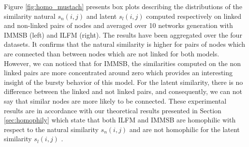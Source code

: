Figure \ref{fig:homo_mustach} presents box plots describing the distributions of the similarity natural $s_n(i,j)$ and latent $s_l(i,j)$ computed respectively on linked and non-linked pairs of nodes and averaged over 10 networks generation with IMMSB (left) and ILFM (right). The results have been aggregated over the four datasets.  It confirms that the natural similarity is  higher for  pairs of nodes which are connected than between nodes which are not linked for both models. However, we can noticed that for IMMSB, the similarities computed on the non linked pairs are more concentrated around zero which provides an interesting insight of the bursty behavior of this model. For the latent similarity,  there is no difference between the linked and not linked pairs, and consequently, we can not say that similar nodes are more likely to be connected. These experimental results are in accordance with our theoretical results presented in Section \ref{sec:homophily} which state that both ILFM and IMMSB are homophilic with respect to the natural similarity $s_n(i,j)$ and are not homophilic for the latent similarity $s_l(i,j)$ .
